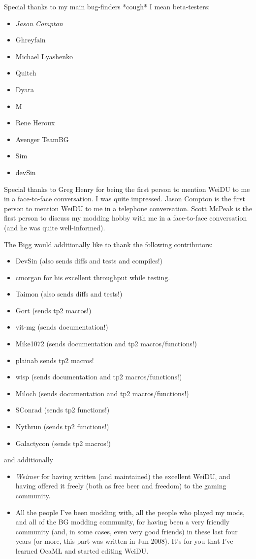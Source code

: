 \documentclass{article}
\begin{document}
Special thanks to my main bug-finders *cough* I mean beta-testers:
\begin{itemize}
\item {\em Jason Compton }
\item Ghreyfain
\item Michael Lyashenko
\item Quitch
\item Dyara
\item M
\item Rene Heroux
\item Avenger TeamBG
\item Sim
\item devSin

\end{itemize}

Special thanks to Greg Henry for being the first person to mention WeiDU to
me in a face-to-face conversation. I was quite impressed. Jason Compton is
the first person to mention WeiDU to me in a telephone conversation. Scott
McPeak is the first person to discuss my modding hobby with me in a
face-to-face conversation (and he was quite well-informed).

The Bigg would additionally like to thank the following contributors:
\begin{itemize}
\item DevSin (also sends diffs and tests and compiles!)
\item cmorgan for his excellent throughput while testing.
\item Taimon (also sends diffs and tests!)
\item Gort (sends tp2 macros!)
\item vit-mg (sends documentation!)
\item Mike1072 (sends documentation and tp2 macros/functions!)
\item plainab {sends tp2 macros!}
\item wisp (sends documentation and tp2 macros/functions!)
\item Miloch (sends documentation and tp2 macros/functions!)
\item SConrad (sends tp2 functions!)
\item Nythrun (sends tp2 functions!)
\item Galactycon (sends tp2 macros!)
\end{itemize}
and additionally
\begin{itemize}
\item {\em Weimer} for having written (and maintained) the excellent WeiDU,
and having offered it freely (both as free beer and freedom) to the gaming
community.
\item All the people I've been modding with, all the people who played my mods,
and all of the BG modding community, for having been a very friendly community
(and, in some cases, even very good friends) in these last four years (or more,
this part was written in Jun 2008). It's for you that I've learned OcaML and
started editing WeiDU.
\end{itemize}
\end{document}
